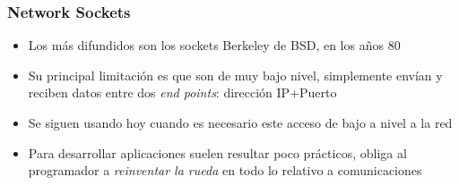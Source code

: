 \documentclass[ucs]{beamer}
\begin{document}
\begin{frame}[fragile]
\frametitle{Network Sockets}
\begin{itemize}
\item
Los más difundidos son los sockets
Berkeley de BSD, en los años 80
\item
Su principal limitación es que son de muy bajo nivel, simplemente
envían y reciben datos entre dos \emph{end points}: dirección IP+Puerto
\item
Se siguen usando hoy cuando es necesario este acceso de bajo a nivel a la red
\item
Para desarrollar aplicaciones suelen resultar poco prácticos, obliga al programador
a \emph{reinventar la rueda} en todo lo relativo a comunicaciones
\end{itemize}
\end{frame}
\end{document}
